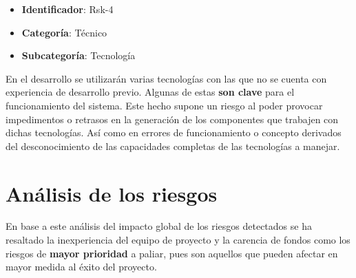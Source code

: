 \begin{itemize}
    \item \textbf{Identificador}: Rsk-4
    \item \textbf{Categoría}: Técnico
    \item \textbf{Subcategoría}: Tecnología
\end{itemize}

En el desarrollo se utilizarán varias tecnologías con las que no se cuenta con experiencia de desarrollo previo. Algunas de estas \textbf{son clave} para el funcionamiento del sistema. Este hecho supone un riesgo al poder provocar impedimentos o retrasos en la generación de los componentes que trabajen con dichas tecnologías. Así como en errores de funcionamiento o concepto derivados del desconocimiento de las capacidades completas de las tecnologías a manejar.

\section{Análisis de los riesgos}

\begin{table}[H]
    \centering
    \caption{Probabilidades y impacto de los riesgos}
    \label{tab:riesgos}
\end{table}

\vspace{-20pt}
En base a este análisis del impacto global de los riesgos detectados se ha resaltado la inexperiencia del equipo de proyecto y la carencia de fondos como los riesgos de \textbf{mayor prioridad} a paliar, pues son aquellos que pueden afectar en mayor medida al éxito del proyecto.


